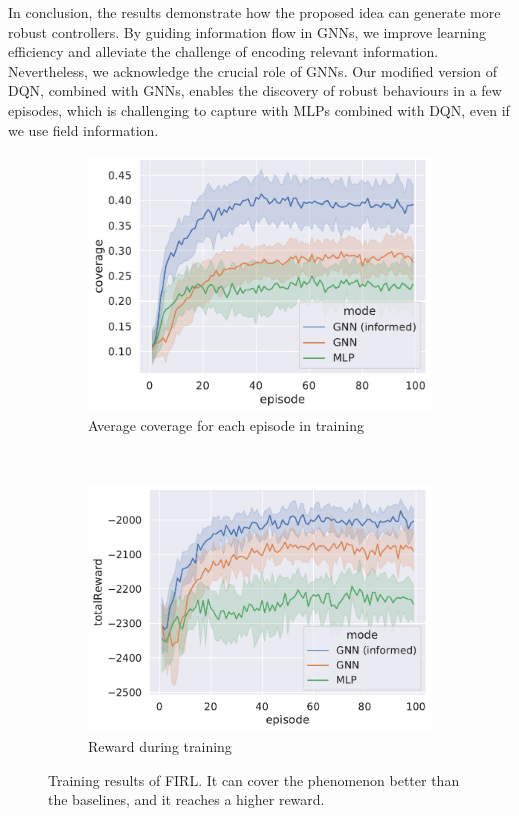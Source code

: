 In conclusion, the results demonstrate how the proposed idea can generate more robust controllers. 
 By guiding information flow in \acp{GNN}, 
 we improve learning efficiency and alleviate the challenge of encoding relevant information. 
%
Nevertheless, we acknowledge the crucial role of \acp{GNN}. 
 Our modified version of DQN, combined with \acp{GNN}, 
 enables the discovery of robust behaviours in a few episodes, 
 which is challenging to capture with \acp{MLP} combined with \ac{DQN}, even if we use field information.
\begin{figure}
  \centering
  \hfill
  \begin{subfigure}[b]{0.885\linewidth}
    \includegraphics[width=\linewidth]{papers/acsos2023/imgs/coverage-in-time}
    \caption{Average coverage for each episode in training }
    \label{fig:coverage}
  \end{subfigure}\\
  \hfill
  \begin{subfigure}[b]{0.91\linewidth}
    \includegraphics[width=\linewidth]{papers/acsos2023/imgs/reward-in-time}
    \caption{Reward during training}
    \label{fig:reward}
  \end{subfigure}
  \caption[Training results of \ac{FIRL}.]{Training results of \ac{FIRL}.
  It can cover the phenomenon better than the baselines, and it reaches a higher reward. 
  }
  \label{fig:training}
\end{figure}


